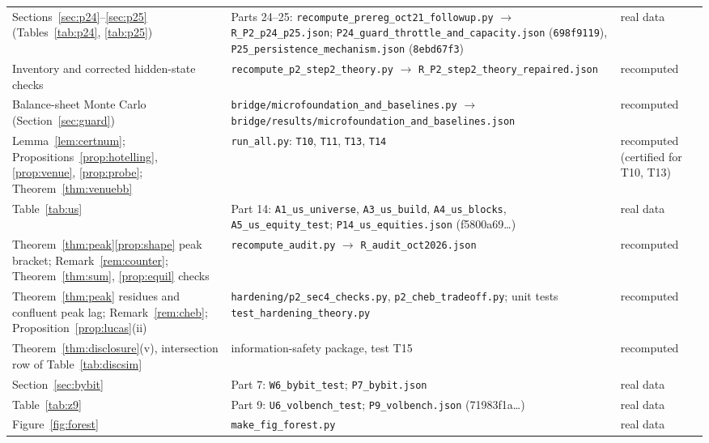 \begin{longtable}{p{}p{}p{}}
Sections~\ref{sec:p24}--\ref{sec:p25} (Tables~\ref{tab:p24}, \ref{tab:p25}) & Parts 24--25: \texttt{recompute\_\allowbreak prereg\_\allowbreak oct21\_\allowbreak followup.py} $\to$ \texttt{R\_P2\_\allowbreak p24\_\allowbreak p25.json}; \texttt{P24\_\allowbreak guard\_\allowbreak throttle\_\allowbreak and\_\allowbreak capacity.json} (\texttt{698f9119}), \texttt{P25\_\allowbreak persistence\_\allowbreak mechanism.json} (\texttt{8ebd67f3}) & real data\\
Inventory and corrected hidden-state checks & \texttt{recompute\_\allowbreak p2\_\allowbreak step2\_\allowbreak theory.py} $\to$ \texttt{R\_P2\_\allowbreak step2\_\allowbreak theory\_repaired.json} & recomputed\\
Balance-sheet Monte Carlo (Section~\ref{sec:guard}) & \texttt{bridge/\allowbreak microfoundation\_\allowbreak and\_\allowbreak baselines.py} $\to$ \texttt{bridge/\allowbreak results/\allowbreak microfoundation\_\allowbreak and\_\allowbreak baselines.json} & recomputed\\
Lemma~\ref{lem:certnum}; Propositions~\ref{prop:hotelling}, \ref{prop:venue}, \ref{prop:probe}; Theorem~\ref{thm:venuebb} & \texttt{run\_all.py}: \texttt{T10}, \texttt{T11}, \texttt{T13}, \texttt{T14} & recomputed (certified for T10, T13)\\
Table~\ref{tab:us} & Part 14: \texttt{A1\_us\_universe}, \texttt{A3\_us\_build}, \texttt{A4\_us\_blocks}, \texttt{A5\_us\_equity\_test}; \texttt{P14\_us\_equities.json} (f5800a69\ldots) & real data\\
Theorem~\ref{thm:peak}\ref{prop:shape} peak bracket; Remark~\ref{rem:counter}; Theorem~\ref{thm:sum}, \ref{prop:equil} checks & \texttt{recompute\_audit.py} $\to$ \texttt{R\_audit\_oct2026.json} & recomputed\\
Theorem~\ref{thm:peak} residues and confluent peak lag; Remark~\ref{rem:cheb}; Proposition~\ref{prop:lucas}(ii) & \texttt{hardening/p2\_sec4\_checks.py}, \texttt{p2\_cheb\_tradeoff.py}; unit tests \texttt{test\_hardening\_theory.py} & recomputed\\
Theorem~\ref{thm:disclosure}(v), intersection row of Table~\ref{tab:discsim} & information-safety package, test T15 & recomputed\\
Section~\ref{sec:bybit} & Part 7: \texttt{W6\_bybit\_test}; \texttt{P7\_bybit.json} & real data\\
Table~\ref{tab:z9} & Part 9: \texttt{U6\_volbench\_test}; \texttt{P9\_volbench.json} (71983f1a\ldots) & real data\\
Figure~\ref{fig:forest} & \texttt{make\_fig\_forest.py} & real data\\
\bottomrule
\end{longtable}





